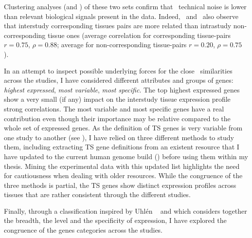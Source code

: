 Clustering analyses (and \Welchttest) of these two sets
confirm that \Rnaseq\ technical noise is
lower than relevant biological signals present in the data.
Indeed,~\cite{Sudmant2015-zt,Danielsson2015-cn,Yu2015-uh} and~\cite{Uhlen:2016}
also observe that interstudy corresponding tissues pairs are more related than
intrastudy non-corresponding tissue ones
(average correlation for corresponding tissue-pairs $r=0.75$, $\rho=0.88$;
average for non-corresponding tissue-pairs $r=0.20$, $\rho=0.75$).\mybr\

In an attempt to inspect possible underlying forces for the close \treps\
similarities across the studies,
I have considered different attributes and groups of genes:
\emph{highest expressed}, \emph{most variable}, \emph{most specific}.
The top highest expressed genes show a very small (if any) impact on
the interstudy tissue expression profile strong correlations.
The most variable and most specific genes have a real contribution even though
their importance may be relative compared to the whole set of expressed genes.
As the definition of \gls{TS} genes is very variable from one study to another
(see \Cref{sub:TisSpeGene}),
I have relied on three different methods to study them,
including extracting \gls{TS} gene definitions
from an existent resource
that I have updated to the current human genome build ()
before using them within my thesis.
Mining the experimental data with this updated list highlights
the need for cautiousness when dealing with older resources.
While the congruence of the three methods is partial,
the \gls{TS} genes show distinct expression profiles across tissues
that are rather consistent through the different studies.\mybr\

Finally, through a classification inspired
by Uhlén \etal\ 
and which considers together the breadth, the level and the specificity of expression,
I have explored the congruence of the genes categories across the studies.\mybr\

